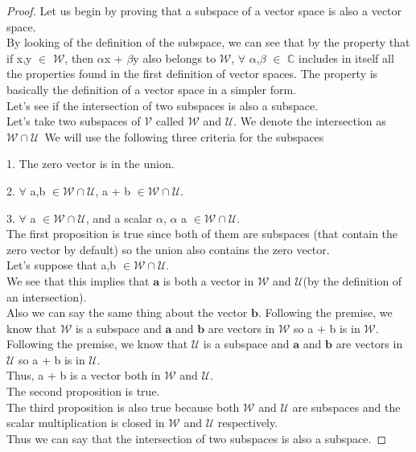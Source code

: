 \documentclass[12pt,a4paper]{article}
\begin{document}
\begin{proof}
Let us begin by proving that a subspace of a vector space is also a vector space. \\By looking of the definition of the subspace, we can see that by the property
that if x,y $\in$ $\mathcal{W}$, then $\alpha$x + $\beta$y also belongs to $\mathcal{W}$, $\forall$ $\alpha$,$\beta$ $\in$ $\mathbb{C}$ includes in itself all the properties found in the first definition of vector spaces. The property is basically the definition of a vector space in a simpler form.\\
Let's see if the intersection of two subspaces is also a subspace.\\
Let's take two subspaces of $\mathcal{V}$ called $\mathcal{W}$ and $\mathcal{U}$. We denote the intersection as $\mathcal{W} \cap \mathcal{U}$\
We will use the following three criteria for the subspaces
\item \hspace{1cm} 1. The zero vector is in the union.
\item \hspace{1cm} 2. $\forall$ a,b $\in \mathcal{W} \cap \mathcal{U}$,  a + b $\in \mathcal{W} \cap \mathcal{U}$.
\item \hspace{1cm} 3. $\forall$ a $\in \mathcal{W} \cap \mathcal{U}$, and a scalar $\alpha$, $\alpha$ a $\in  \mathcal{W} \cap \mathcal{U}$.
\\The first proposition is true since both of them are subspaces (that contain the zero vector by default) so the union also contains the zero vector.\\
Let's suppose that  a,b $\in \mathcal{W} \cap \mathcal{U}$.\\
We see that this implies that $\textbf{a}$ is both a vector in $\mathcal{W}$ and $\mathcal{U}$(by the definition of an intersection).\\
Also we can say the same thing about the vector $\textbf{b}$.
Following the premise, we know that $\mathcal{W}$ is a subspace and $\textbf{a}$ and $\textbf{b}$ are vectors in $\mathcal{W}$ so a + b is in $\mathcal{W}$.\\
Following the premise, we know that $\mathcal{U}$ is a subspace and $\textbf{a}$ and $\textbf{b}$ are vectors in $\mathcal{U}$ so a + b is in $\mathcal{U}$.\\
Thus, a + b is a vector both in $\mathcal{W}$ and $\mathcal{U}$. \\
The second proposition is true.\\
The third proposition is also true because both $\mathcal{W}$ and $\mathcal{U}$ are subspaces and the scalar multiplication is closed in $\mathcal{W}$ and $\mathcal{U}$ respectively.
\\Thus we can say that the intersection of two subspaces is also a subspace.
\end{proof}
\end{document}
